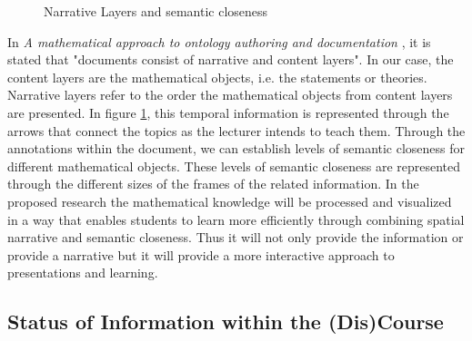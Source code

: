 \documentclass[twoside, 12pt]{article}
\begin{document}
\begin{figure}
\vspace{-26pt}
  \begin{center}
  \end{center}
\vspace{-20pt}
  \caption{Narrative Layers and semantic closeness}
  \label{fig:Annie-semantic-closeness}
\vspace{-10pt}
\end{figure}

In \textit{A mathematical approach to ontology authoring and
documentation} \cite{LK:MathOntoAuthDoc09}, it is stated that "documents consist of narrative and content layers". In our case, the content layers are the mathematical objects, i.e. the statements or theories. Narrative layers refer to the order the mathematical objects from content layers are presented. In figure \ref{fig:Annie-semantic-closeness}, this temporal information is represented through the arrows that connect the topics as the lecturer intends to teach them. Through the annotations within the document, we can establish levels of semantic closeness for different mathematical objects. These levels of semantic closeness are represented through the different sizes of the frames of the related information. In the proposed research the mathematical knowledge will be processed and visualized in a way that enables students to learn more efficiently through combining spatial narrative and semantic closeness. Thus it will not only provide the information or provide a narrative but it will provide a more interactive approach to presentations and learning.\\

\subsection{Status of Information within the (Dis)Course}
\label{sec:infostatus}
\end{document}
